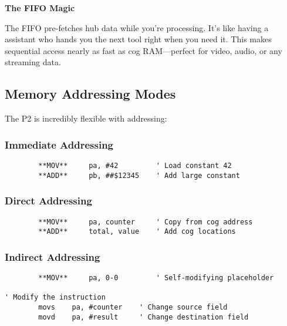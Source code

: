 \documentclass[11pt]{book}
\begin{document}
\begin{interlude}
\textbf{The FIFO Magic}

The FIFO pre-fetches hub data while you're processing. It's like having a assistant who hands you the next tool right when you need it. This makes sequential access nearly as fast as cog RAM—perfect for video, audio, or any streaming data.
\end{interlude}

\hypertarget{memory-addressing-modes}{%
\subsection{Memory Addressing Modes}\label{memory-addressing-modes}}

The P2 is incredibly flexible with addressing:

\hypertarget{immediate-addressing}{%
\subsubsection{Immediate Addressing}\label{immediate-addressing}}

\begin{lstlisting}
        **MOV**     pa, #42         ' Load constant 42
        **ADD**     pb, ##$12345    ' Add large constant
\end{lstlisting}

\hypertarget{direct-addressing}{%
\subsubsection{Direct Addressing}\label{direct-addressing}}

\begin{lstlisting}
        **MOV**     pa, counter     ' Copy from cog address
        **ADD**     total, value    ' Add cog locations
\end{lstlisting}

\hypertarget{indirect-addressing}{%
\subsubsection{Indirect Addressing}\label{indirect-addressing}}

\begin{lstlisting}
        **MOV**     pa, 0-0         ' Self-modifying placeholder
        
' Modify the instruction
        movs    pa, #counter    ' Change source field
        movd    pa, #result     ' Change destination field
\end{lstlisting}
\end{document}
